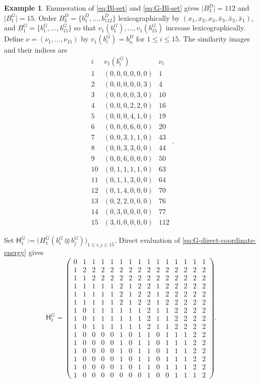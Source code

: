 \documentclass[11pt,reqno]{amsart}
\numberwithin{table}{section}
\numberwithin{equation}{section}
\theoremstyle{plain}
\theoremstyle{definition}
\newtheorem{example}[theorem]{Example}
\begin{document}
\begin{example}
	Enumeration of \eqref{eq:Bl-set} and
	\eqref{eq:G-Bl-set} gives
	\(\lvert B_3^D\rvert=112\) and \(\lvert B_1^G\rvert=15\).
	Order \(B_3^D=\{b_1^D,\ldots,b_{112}^D\}\) lexicographically by
	\((x_1,x_2,x_3,\bar x_3,\bar x_2,\bar x_1)\), and
	\(B_1^G=\{b_1^G,\ldots,b_{15}^G\}\) so that
	\(v_1(b_1^G),\ldots,v_1(b_{15}^G)\) increase lexicographically.
	Define \(\nu=(\nu_1,\ldots,\nu_{15})\) by
	\(v_1(b_i^G)=b_{\nu_i}^D\) for \(1\le i\le15\).
	The similarity images and their indices are
	\[
	\begin{array}{c|c|c}
		i&v_1(b_i^G)&\nu_i\\ \hline
		1 &(0,0,0,0,0,0)&1\\
		2 &(0,0,0,0,0,3)&4\\
		3 &(0,0,0,0,3,0)&10\\
		4 &(0,0,0,2,2,0)&16\\
		5 &(0,0,0,4,1,0)&19\\
		6 &(0,0,0,6,0,0)&20\\
		7 &(0,0,3,1,1,0)&43\\
		8 &(0,0,3,3,0,0)&44\\
		9 &(0,0,6,0,0,0)&50\\
		10&(0,1,1,1,1,0)&63\\
		11&(0,1,1,3,0,0)&64\\
		12&(0,1,4,0,0,0)&70\\
		13&(0,2,2,0,0,0)&76\\
		14&(0,3,0,0,0,0)&77\\
		15&(3,0,0,0,0,0)&112
	\end{array}.
	\]

	Set
	\(\mathsf H_1^G
	:=
	\bigl(H_1^G(b_i^G\otimes b_j^G)\bigr)_{1\le i,j\le15}\).
	Direct evaluation of \eqref{eq:G-direct-coordinate-energy} gives
	\begingroup
	\scriptsize
	\setlength{\arraycolsep}{2.5pt}
	\[
	\mathsf H_1^G
	=
	\begin{pmatrix}
		0&1&1&1&1&1&1&1&1&1&1&1&1&1&1\\
		1&2&2&2&2&2&2&2&2&2&2&2&2&2&2\\
		1&1&2&2&2&2&2&2&2&2&2&2&2&2&2\\
		1&1&1&1&1&2&1&2&2&1&2&2&2&2&2\\
		1&1&1&1&1&2&1&2&2&1&2&2&2&2&2\\
		1&1&1&1&1&2&1&2&2&1&2&2&2&2&2\\
		1&0&1&1&1&1&1&1&2&1&1&2&2&2&2\\
		1&0&1&1&1&1&1&1&2&1&1&2&2&2&2\\
		1&0&1&1&1&1&1&1&2&1&1&2&2&2&2\\
		1&0&0&0&0&1&0&1&1&0&1&1&1&2&2\\
		1&0&0&0&0&1&0&1&1&0&1&1&1&2&2\\
		1&0&0&0&0&1&0&1&1&0&1&1&1&2&2\\
		1&0&0&0&0&1&0&1&1&0&1&1&1&2&2\\
		1&0&0&0&0&1&0&1&1&0&1&1&1&2&2\\
		1&0&0&0&0&0&0&0&1&0&0&1&1&1&2
	\end{pmatrix}.
	\]
	\endgroup


\end{example}
\end{document}
